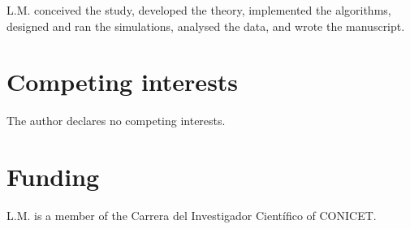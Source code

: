 L.M. conceived the study, developed the theory, implemented the algorithms, designed and ran the simulations, analysed the data, and wrote the manuscript.

\section*{Competing interests}

The author declares no competing interests.

\section*{Funding}

L.M. is a member of the Carrera del Investigador Cient\'ifico of CONICET. %
